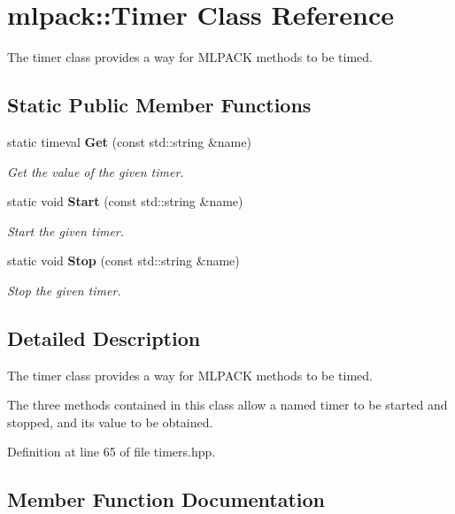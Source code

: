 \section{mlpack\-:\-:Timer Class Reference}
\label{classmlpack_1_1Timer}


The timer class provides a way for M\-L\-P\-A\-C\-K methods to be timed.  


\subsection*{Static Public Member Functions}
\begin{DoxyCompactItemize}
\item 
static timeval {\bf Get} (const std\-::string \&name)
\begin{DoxyCompactList}\small\item\em Get the value of the given timer. \end{DoxyCompactList}\item 
static void {\bf Start} (const std\-::string \&name)
\begin{DoxyCompactList}\small\item\em Start the given timer. \end{DoxyCompactList}\item 
static void {\bf Stop} (const std\-::string \&name)
\begin{DoxyCompactList}\small\item\em Stop the given timer. \end{DoxyCompactList}\end{DoxyCompactItemize}


\subsection{Detailed Description}
The timer class provides a way for M\-L\-P\-A\-C\-K methods to be timed. 

The three methods contained in this class allow a named timer to be started and stopped, and its value to be obtained. 

Definition at line 65 of file timers.\-hpp.



\subsection{Member Function Documentation}
